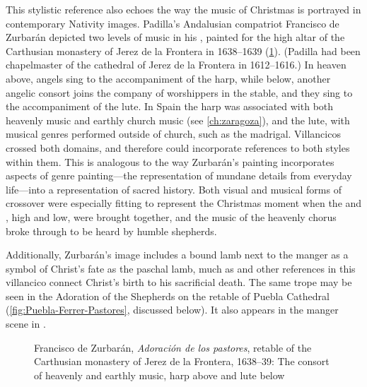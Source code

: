 This stylistic reference also echoes the way the music of Christmas is portrayed
in contemporary Nativity images.
Padilla's Andalusian compatriot Francisco de Zurbarán depicted two levels of
music in his , painted for the high altar of
the Carthusian monastery of Jerez de la Frontera in 1638--1639
(\cref{fig:Zurbaran-Jerez-Adoracion}).
(Padilla had been chapelmaster of the cathedral of Jerez de la Frontera in
1612--1616.)%
    \Autocite{Gembero:Padilla}
In heaven above, angels sing to the accompaniment of the harp, while below,
another angelic consort joins the company of worshippers in the stable, and they
sing to the accompaniment of the lute.
In Spain the harp was associated with both heavenly music and earthly church
music (see \cref{ch:zaragoza}), and the lute, with musical genres
performed outside of church, such as the madrigal.
Villancicos crossed both domains, and therefore could incorporate references to
both styles within them.
This is analogous to the way Zurbarán's painting incorporates aspects of genre
painting---the representation of mundane details from everyday life---into a
representation of sacred history.%
    \Autocites[31]{Sanchez:Zurbaran}{Cherry:Bodegon}{Haraszti-Takacs:Genre}
Both visual and musical forms of crossover were especially fitting to represent
the Christmas moment when the  and , high and low,
were brought together, and the music of the heavenly chorus broke through to be
heard by humble shepherds.%
\begin{Footnote}
    Additionally, Zurbarán's image includes a bound lamb next to the manger as a
    symbol of Christ's fate as the paschal lamb, much as  and other references in this villancico connect Christ's birth
    to his sacrificial death.
    The same trope may be seen in the Adoration of the Shepherds on the retable
    of Puebla Cathedral (\cref{fig:Puebla-Ferrer-Pastores}, discussed below).
    It also appears in the manger scene in
    \autocite[168]{Catholic:Breviarium1631}.
\end{Footnote}

\begin{figure}
    \caption{Francisco de Zurbarán, \emph{Adoración de los pastores}, retable of
    the Carthusian monastery of Jerez de la Frontera, 1638--39: The consort of
    heavenly and earthly music, harp above and lute below}

    \label{fig:Zurbaran-Jerez-Adoracion}

\end{figure}

